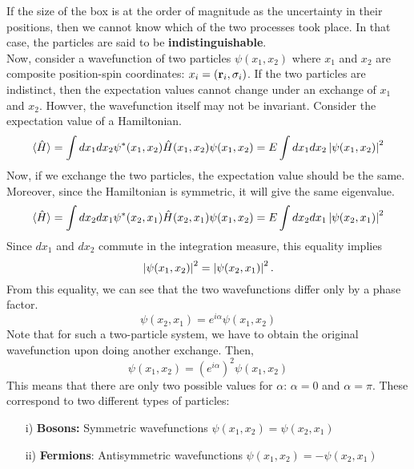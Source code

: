 If the size of the box is at the order of magnitude as the uncertainty in their positions, then we cannot know which of the two processes took place. In that case, the particles are said to be \textbf{indistinguishable}. \\
Now, consider a wavefunction of two particles $\psi(x_1,x_2)$ where $x_1$ and $x_2$ are composite position-spin coordinates: $x_i = (\mathbf{r}_i,\sigma_i)$. If the two particles are indistinct, then the expectation values cannot change under an exchange of $x_1$ and $x_2$. Howver, the wavefunction itself may not be invariant. Consider the expectation value of a Hamiltonian. 
\begin{equation}
    \langle \hat{H} \rangle = \int dx_1dx_2\psi^*(x_1,x_2)\hat{H}(x_1,x_2)\psi(x_1,x_2) = E\int dx_1dx_2\left| \psi(x_1,x_2) \right|^2
\end{equation}
Now, if we exchange the two particles, the expectation value should be the same. Moreover, since the Hamiltonian is symmetric, it will give the same eigenvalue. 
\begin{equation}
    \langle \hat{H} \rangle = \int dx_2dx_1\psi^*(x_2,x_1)\hat{H}(x_2,x_1)\psi(x_1,x_2)=E\int dx_2dx_1\left| \psi(x_2,x_1) \right|^2
\end{equation}
Since $dx_1$ and $dx_2$ commute in the integration measure, this equality implies
\begin{equation}
    \left| \psi(x_1,x_2) \right|^2 = \left| \psi(x_2,x_1) \right|^2.
\end{equation}
From this equality, we can see that the two wavefunctions differ only by a phase factor.
\begin{equation}
    \psi(x_2,x_1)=e^{i\alpha}\psi(x_1,x_2)
\end{equation}
Note that for such a two-particle system, we have to obtain the original wavefunction upon doing another exchange. Then,
\begin{equation}
    \psi(x_1,x_2) = (e^{i\alpha})^2\psi(x_1,x_2)
\end{equation}
This means that there are only two possible values for $\alpha$: $\alpha=0$ and $\alpha=\pi$. These correspond to two different types of particles:
\begin{itemize}
    \item[i)] \textbf{Bosons:} Symmetric wavefunctions $\psi(x_1,x_2)=\psi(x_2,x_1)$
    \item[ii)] \textbf{Fermions}: Antisymmetric wavefunctions $\psi(x_1,x_2)=-\psi(x_2,x_1)$
\end{itemize}
